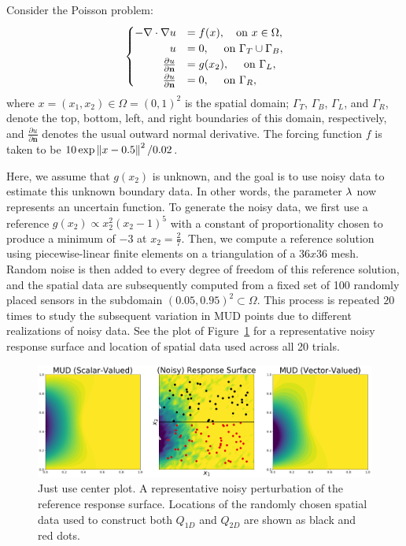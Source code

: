Consider the Poisson problem:
\begin{equation}\label{eq:pde-equation}
\begin{cases}
\hfill -\nabla \cdot \nabla u &= f(x), \quad\text{on } x\in \Omega, \\
\hfill u &= 0, \quad\text{ on } \Gamma_T \cup \Gamma_B, \\
\hfill \frac{\partial u}{\partial \mathbf{n}} &= g(x_2), \quad\text{ on } \Gamma_L, \\
\hfill \frac{\partial u}{\partial \mathbf{n}} &= 0, \quad\text{ on } \Gamma_R,
\end{cases}
\end{equation}
where $x=(x_1, x_2) \in \Omega = (0,1)^2$ is the spatial domain; $\Gamma_T$, $\Gamma_B$, $\Gamma_L$, and $\Gamma_R$, denote the top, bottom, left, and right boundaries of this domain, respectively, and $\frac{\partial u}{\partial \mathbf{n}}$ denotes the usual outward normal derivative.
The forcing function $f$ is taken to be $10\exp{\left\Vert x - 0.5\right\Vert^2 / 0.02}$.

Here, we assume that $g(x_2)$ is unknown, and the goal is to use noisy data to estimate this unknown boundary data.
In other words, the parameter $\lambda$ now represents an uncertain function.
To generate the noisy data, we first use a reference $g(x_2)\propto x_2^2(x_2-1)^5$ with a constant of proportionality chosen to produce a minimum of $-3$ at $x_2=\frac{2}{7}$.
Then, we compute a reference solution using piecewise-linear finite elements on a triangulation of a $36x36$ mesh.
Random noise is then added to every degree of freedom of this reference solution, and the spatial data are subsequently computed from a fixed set of 100 randomly placed sensors in the subdomain $(0.05, 0.95)^2 \subset \Omega$.
This process is repeated $20$ times to study the subsequent variation in MUD points due to different realizations of noisy data.
See the plot of Figure~\ref{fig:pde-Q} for a representative noisy response surface and location of spatial data used across all 20 trials.

\begin{figure}[htbp]
\centering
\includegraphics[width=0.95\linewidth]{figures/pde-highd/pde-highd_surf_exmud_D2_m100}
\caption{
{\color{blue}Just use center plot.}
A representative noisy perturbation of the reference response surface. Locations of the randomly chosen spatial data used to construct both $Q_{1D}$ and $Q_{2D}$ are shown as black and red dots.
}
\label{fig:pde-Q}
\end{figure}

